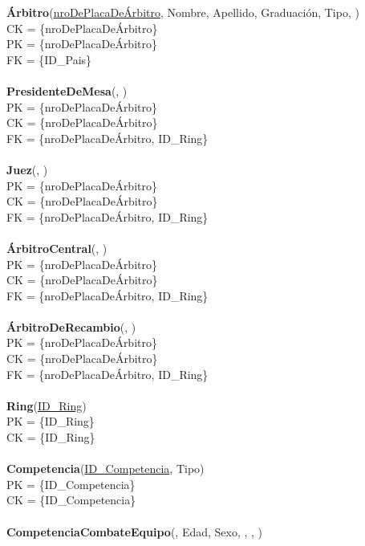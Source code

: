 \textbf{Árbitro}(\uline{nroDePlacaDeÁrbitro}, Nombre, Apellido, Graduación, Tipo, )\\
CK = \{nroDePlacaDeÁrbitro\}\\
PK = \{nroDePlacaDeÁrbitro\}\\
FK = \{ID\_Pais\}\\
\\
\textbf{PresidenteDeMesa}(, )\\
PK = \{nroDePlacaDeÁrbitro\}\\
CK = \{nroDePlacaDeÁrbitro\}\\
FK = \{nroDePlacaDeÁrbitro, ID\_Ring\}\\
\\
\textbf{Juez}(, )\\
PK = \{nroDePlacaDeÁrbitro\}\\
CK = \{nroDePlacaDeÁrbitro\}\\
FK = \{nroDePlacaDeÁrbitro, ID\_Ring\}\\
\\
\textbf{ÁrbitroCentral}(, )\\
PK = \{nroDePlacaDeÁrbitro\}\\
CK = \{nroDePlacaDeÁrbitro\}\\
FK = \{nroDePlacaDeÁrbitro, ID\_Ring\}\\
\\
\textbf{ÁrbitroDeRecambio}(, )\\
PK = \{nroDePlacaDeÁrbitro\}\\
CK = \{nroDePlacaDeÁrbitro\}\\
FK = \{nroDePlacaDeÁrbitro, ID\_Ring\}\\
\\
\textbf{Ring}(\uline{ID\_Ring})\\
PK = \{ID\_Ring\}\\
CK = \{ID\_Ring\}\\
\\
\textbf{Competencia}(\uline{ID\_Competencia}, Tipo)\\
PK = \{ID\_Competencia\}\\
CK = \{ID\_Competencia\}\\
\\
\textbf{CompetenciaCombateEquipo}(, Edad, Sexo, , , )\\
